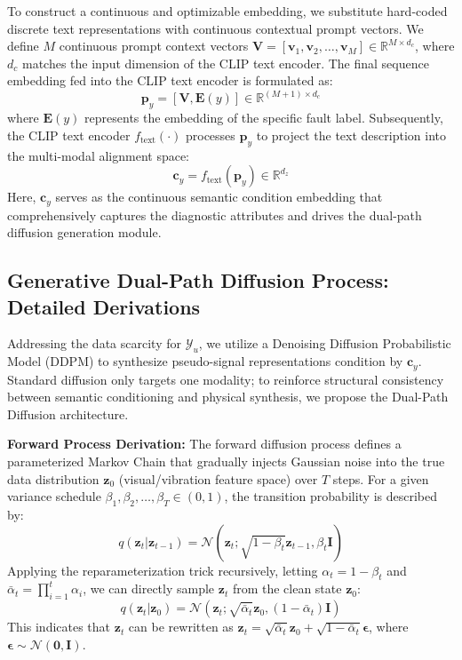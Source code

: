To construct a continuous and optimizable embedding, we substitute hard-coded discrete text representations with continuous contextual prompt vectors. We define $M$ continuous prompt context vectors $\mathbf{V} = [\mathbf{v}_1, \mathbf{v}_2, \dots, \mathbf{v}_M] \in \mathbb{R}^{M \times d_c}$, where $d_c$ matches the input dimension of the CLIP text encoder. The final sequence embedding fed into the CLIP text encoder is formulated as:
\begin{equation}\label{eq:clip_prompt}
\mathbf{p}_y = [\mathbf{V}, \mathbf{E}(y)] \in \mathbb{R}^{(M+1) \times d_c}
\end{equation}
where $\mathbf{E}(y)$ represents the embedding of the specific fault label. Subsequently, the CLIP text encoder $f_{\text{text}}(\cdot)$ processes $\mathbf{p}_y$ to project the text description into the multi-modal alignment space:
\begin{equation}\label{eq:clip_encoded}
\mathbf{c}_y = f_{\text{text}}(\mathbf{p}_y) \in \mathbb{R}^{d_z}
\end{equation}
Here, $\mathbf{c}_y$ serves as the continuous semantic condition embedding that comprehensively captures the diagnostic attributes and drives the dual-path diffusion generation module.

\subsection{Generative Dual-Path Diffusion Process: Detailed Derivations}
\label{subsec:diffusion_process}

Addressing the data scarcity for $\mathcal{Y}_u$, we utilize a Denoising Diffusion Probabilistic Model (DDPM) to synthesize pseudo-signal representations condition by $\mathbf{c}_y$. Standard diffusion only targets one modality; to reinforce structural consistency between semantic conditioning and physical synthesis, we propose the Dual-Path Diffusion architecture. 

\textbf{Forward Process Derivation:} The forward diffusion process defines a parameterized Markov Chain that gradually injects Gaussian noise into the true data distribution $\mathbf{z}_0$ (visual/vibration feature space) over $T$ steps. For a given variance schedule $\beta_1, \beta_2, \ldots, \beta_T \in (0,1)$, the transition probability is described by:
\begin{equation}\label{eq:forward_diffusion_step}
q(\mathbf{z}_t | \mathbf{z}_{t-1}) = \mathcal{N}(\mathbf{z}_t; \sqrt{1-\beta_t}\mathbf{z}_{t-1}, \beta_t \mathbf{I})
\end{equation}
Applying the reparameterization trick recursively, letting $\alpha_t = 1 - \beta_t$ and $\bar{\alpha}_t = \prod_{i=1}^t \alpha_i$, we can directly sample $\mathbf{z}_t$ from the clean state $\mathbf{z}_0$:
\begin{equation}\label{eq:forward_diffusion_direct}
q(\mathbf{z}_t | \mathbf{z}_0) = \mathcal{N}(\mathbf{z}_t; \sqrt{\bar{\alpha}_t}\mathbf{z}_0, (1 - \bar{\alpha}_t)\mathbf{I})
\end{equation}
This indicates that $\mathbf{z}_t$ can be rewritten as $\mathbf{z}_t = \sqrt{\bar{\alpha}_t}\mathbf{z}_0 + \sqrt{1 - \bar{\alpha}_t}\boldsymbol{\epsilon}$, where $\boldsymbol{\epsilon} \sim \mathcal{N}(\mathbf{0}, \mathbf{I})$.

